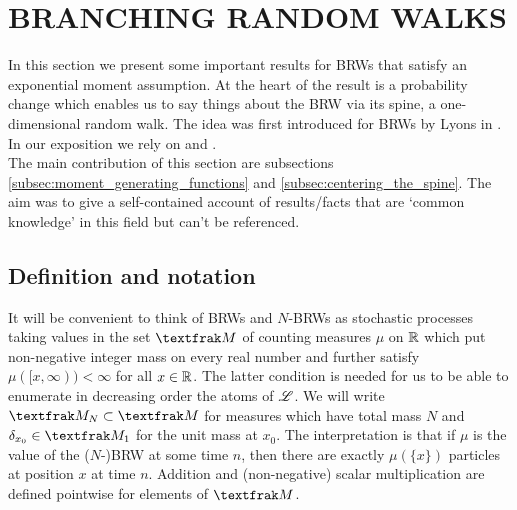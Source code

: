 \section{BRANCHING RANDOM WALKS}\label{sec:BRW_THEORY}

In this section we present some important results for BRWs that satisfy an exponential moment assumption. At the heart of the result is a probability change which enables us to say things about the BRW via its spine, a one-dimensional random walk. The idea was first introduced for BRWs by Lyons in \cite{lyons1997simple}. In our exposition we rely on \cite{mallein2018n} and \cite[Section 4.7]{shi2015branching}. \\

The main contribution of this section are subsections \ref{subsec:moment_generating_functions} and \ref{subsec:centering_the_spine}. The aim was to give a self-contained account of results/facts that are `common knowledge' in this field but can't be referenced. 

\subsection{Definition and notation}
It will be convenient to think of BRWs and $N$-BRWs as stochastic processes taking values in the set $\frak{M}$ of counting measures $\mu$ on $\mathbb{R}$ which put non-negative integer mass on every real number and further satisfy $\mu([x, \infty)) < \infty$ for all $x \in \mathbb{R}$. The latter condition is needed for us to be able to enumerate in decreasing order the atoms of $\mathscr{L}$. We will write $\frak{M}_N \subset \frak{M}$ for measures which have total mass $N$ and $\delta_{x_0} \in \frak{M}_1$ for the unit mass at $x_0$. The interpretation is that if $\mu$ is the value of the ($N$-)BRW at some time $n$, then there are exactly $\mu(\{x\})$ particles at position $x$ at time $n$. Addition and (non-negative) scalar multiplication are defined pointwise for elements of $\frak{M}$. \\


